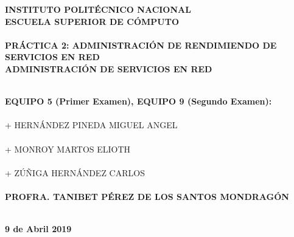 \newpage
\begin{center}
\thispagestyle{empty}
\LARGE{\textsc {\textbf{INSTITUTO POLITÉCNICO NACIONAL}}}\\[0.5cm]
\Large{\textbf{ESCUELA SUPERIOR DE CÓMPUTO}}\\[0.7cm]
\vspace*{3cm}
\LARGE{\textbf{\\PRÁCTICA 2: ADMINISTRACIÓN DE RENDIMIENDO DE SERVICIOS EN RED\\}}
\vspace*{1cm}
\Large{\textbf{ADMINISTRACIÓN DE SERVICIOS EN RED\\}}
\vspace*{3cm}
\end{center}
\large{\textbf{\\EQUIPO 5 (Primer Examen), EQUIPO 9 (Segundo Examen):}}\\
\vspace*{.5cm}
\large{\textsc{\\+ HERNÁNDEZ PINEDA MIGUEL ANGEL}}\\
\large{\textsc{\\+ MONROY MARTOS ELIOTH}}\\
\large{\textsc{\\+ ZÚÑIGA HERNÁNDEZ CARLOS}}\\
\vspace*{1cm}
\large{\textbf{\\PROFRA. TANIBET PÉREZ DE LOS SANTOS MONDRAGÓN}}\\
\vspace*{1cm}
\begin{flushright}
\Large{\textbf{\\9 de Abril 2019}}
\end{flushright}
\newpage